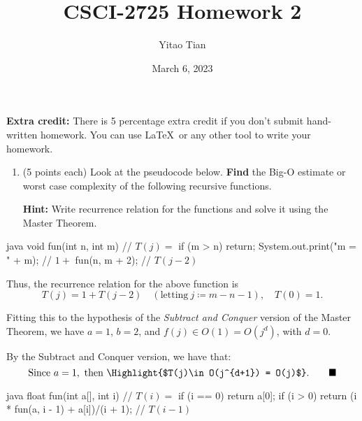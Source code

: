 \documentclass[12pt, a4paper]{article}
\title{CSCI-2725 Homework 2}
\author{Yitao Tian}
\date{March 6, 2023}
\newcommand{\QED}{\tag*{$\blacksquare$}}
\begin{document}
\maketitle

\textbf{Extra credit:} There is 5 percentage extra credit if you don't submit hand-written homework.
You can use \LaTeX\ or any other tool to write your homework.

\begin{enumerate}
  \item (5 points each) Look at the pseudocode below.
  \textbf{Find} the Big-O estimate or worst case complexity of the following recursive functions.

  \textbf{Hint:} Write recurrence relation for the functions and solve it using the Master Theorem.
\end{enumerate}

\begin{MintedUnbreakableCodeBlock}{java}
      void fun(int n, int m) {        // $T(j)=$
        if (m > n) return;
        System.out.print("m = " + m); // $1+$
        fun(n, m + 2);                // $T(j-2)$
      }
\end{MintedUnbreakableCodeBlock}

Thus, the recurrence relation for the above function is
\begin{equation*}
  T(j) = 1 + T(j-2) \quad (\textrm{letting}\ j \coloneqq m-n-1), \quad T(0) = 1.
\end{equation*}

Fitting this to the hypothesis of the \textit{Subtract and Conquer} version of the Master Theorem,
we have $a=1$, $b=2$, and $f(j)\in O(1)=O(j^d)$, with $d=0$.

By the Subtract and Conquer version, we have that:
\begin{equation*}
  \textrm{Since}\ a = 1,\ \textrm{then}\ \Highlight{$T(j)\in O(j^{d+1}) = O(j)$}. \QED
\end{equation*}



\newpage



\begin{MintedUnbreakableCodeBlock}{java}
      float fun(int a[], int i) {                    // $T(i)=$
        if (i == 0) {
          return a[0];
        }
        if (i > 0) {
          return (i * fun(a, i - 1) + a[i])/(i + 1); // $T(i-1)$
        }
      }
\end{MintedUnbreakableCodeBlock}
\end{document}
